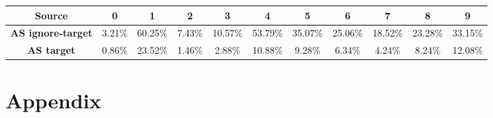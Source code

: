 \documentclass{report}
\begin{document}
\begin{center}
{\tiny
  \begin{tabular}{|c|c|c|c|c|c|c|c|c|c|c|}
  \hline
  \textbf{Source} & \textbf{0} & \textbf{1} & \textbf{2} & \textbf{3} & \textbf{4} & \textbf{5} & \textbf{6} & \textbf{7} & \textbf{8} & \textbf{9}  \\ \hline
  \textbf{AS ignore-target} & 3.21\% & 60.25\% & 7.43\% & 10.57\% & 53.79\% & 35.07\% & 25.06\% & 18.52\% & 23.28\% & 33.15\% \\ \hline
  \textbf{AS target} & 0.86\% & 23.52\% & 1.46\% & 2.88\% & 10.88\% & 9.28\% & 6.34\% & 4.24\% & 8.24\% & 12.08\% \\ \hline
  \end{tabular}
}
\end{center}

\chapter{Appendix}
\end{document}
